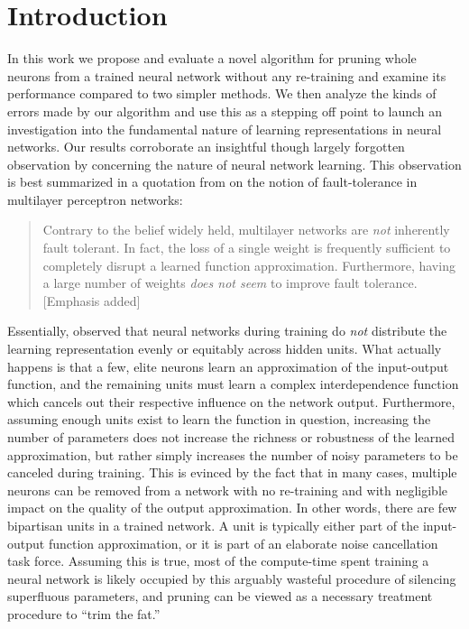 \section{Introduction}\label{sec1}

In this work we propose and evaluate a novel algorithm for pruning whole neurons from a trained neural network without any re-training and examine its performance compared to two simpler methods. We then analyze the kinds of errors made by our algorithm and use this as a stepping off point to launch an investigation into the fundamental nature of learning representations in neural networks. Our results corroborate an insightful though largely forgotten observation by \cite{mozer1989skeletonization} concerning the nature of neural network learning. This observation is best summarized in a quotation from \cite{segee1991fault} on the notion of fault-tolerance in multilayer perceptron networks:

\begin{quotation}
Contrary to the belief widely held, multilayer networks are \textit{not} inherently fault tolerant. In fact, the loss of a single weight is frequently sufficient to completely disrupt a learned function approximation. Furthermore, having a large number of weights \textit{does not seem} to improve fault tolerance. [Emphasis added]
\end{quotation}

Essentially, \cite{mozer1989using} observed that neural networks during training do \textit{not} distribute the learning representation evenly or equitably across hidden units. What actually happens is that a few, elite neurons learn an approximation of the input-output function, and the remaining units must learn a complex interdependence function which cancels out their respective influence on the network output. Furthermore, assuming enough units exist to learn the function in question, increasing the number of parameters does not increase the richness or robustness of the learned approximation, but rather simply increases the number of noisy parameters to be canceled during training. This is evinced by the fact that in many cases, multiple neurons can be removed from a network with no re-training and with negligible impact on the quality of the output approximation. In other words, there are few bipartisan units in a trained network. A unit is typically either part of the input-output function approximation, or it is part of an elaborate noise cancellation task force. Assuming this is true, most of the compute-time spent training a neural network is likely occupied by this arguably wasteful procedure of silencing superfluous parameters, and pruning can be viewed as a necessary treatment procedure to ``trim the fat.''

